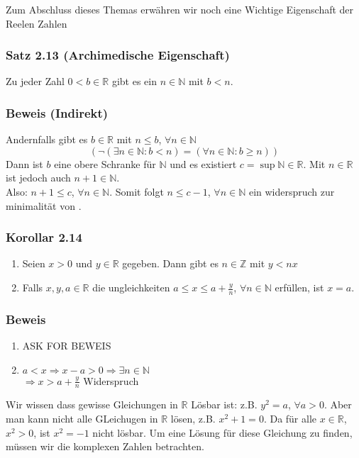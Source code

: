 Zum Abschluss dieses Themas erwähren wir noch eine Wichtige Eigenschaft der Reelen Zahlen

\subsubsection*{Satz 2.13 (Archimedische Eigenschaft)}
Zu jeder Zahl $0<b\in\mathbb{R}$ gibt es ein $n\in\mathbb{N}$ mit $b<n$.
\subsubsection*{Beweis (Indirekt)}
Andernfalls gibt es $b\in\mathbb{R}$ mit $n\leq b$, $\forall n\in\mathbb{N}$ \[\left( \lnot\left(\exists n\in\mathbb{N}:b<n\right)=\left(\forall n\in\mathbb{N}:b\geq n\right)\right)\]
Dann ist $b$ eine obere Schranke für $\mathbb{N}$ und es existiert $c=\sup\mathbb{N}\in\mathbb{R}$. Mit $n\in\mathbb{R}$ ist jedoch auch $n+1\in\mathbb{N}$.\\
Also: $n+1\leq c$, $\forall n\in\mathbb{N}$. Somit folgt $n\leq c-1$, $\forall n\in\mathbb{N}$ ein widerspruch zur minimalität von .

\subsubsection*{Korollar 2.14}
\begin{enumerate}
    \item Seien $x>0$ und $y\in\mathbb{R}$ gegeben. Dann gibt es $n\in\mathbb{Z}$ mit $y<nx$
    \item Falls $x,y,a\in\mathbb{R}$ die ungleichkeiten $a\leq x\leq a+\frac{y}{n}$, $\forall n\in\mathbb{N}$ erfüllen, ist $x=a$.
\end{enumerate}
\subsubsection*{Beweis}

\begin{enumerate}
    \item ASK FOR BEWEIS
    \item $a<x\Rightarrow x-a>0\Rightarrow \exists n\in\mathbb{N}$\\
$\Rightarrow x>a+\frac{y}{n}$ Widerspruch
\end{enumerate}
Wir wissen dass gewisse Gleichungen in $\mathbb{R}$ Lösbar ist: z.B. $y^2=a$, $\forall a>0$. Aber man kann nicht alle GLeichugen in $\mathbb{R}$ lösen, z.B. $x^2+1=0$. Da für alle $x\in\mathbb{R}$, $x^2>0$, ist $x^2=-1$ nicht lösbar. Um eine Lösung für diese Gleichung zu finden, müssen wir die komplexen Zahlen betrachten.\\

